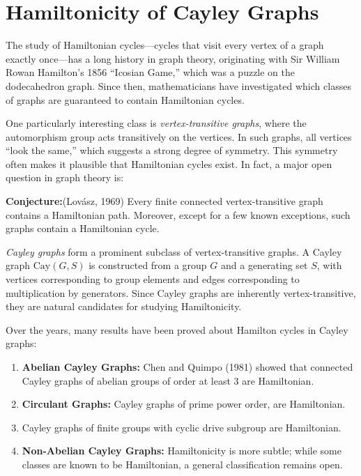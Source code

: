 \documentclass[12pt,a4paper,openany]{book}
\begin{document}
\section{Hamiltonicity of Cayley Graphs}



The study of Hamiltonian cycles---cycles that visit every vertex of a graph exactly once---has a long history in graph theory, originating with Sir William Rowan Hamilton's 1856 ``Icosian Game,'' which was a puzzle on the dodecahedron graph. Since then, mathematicians have investigated which classes of graphs are guaranteed to contain Hamiltonian cycles.

One particularly interesting class is \emph{vertex-transitive graphs}, where the automorphism group acts transitively on the vertices. In such graphs, all vertices ``look the same,'' which suggests a strong degree of symmetry. This symmetry often makes it plausible that Hamiltonian cycles exist. In fact, a major open question in graph theory is:
\bigskip

\noindent\textbf{Conjecture:}(Lov\'asz, 1969) Every finite connected vertex-transitive graph contains a Hamiltonian path. Moreover, except for a few known exceptions, such graphs contain a Hamiltonian cycle.
\bigskip

\emph{Cayley graphs} form a prominent subclass of vertex-transitive graphs. A Cayley graph $\mathrm{Cay}(G,S)$ is constructed from a group $G$ and a generating set $S$, with vertices corresponding to group elements and edges corresponding to multiplication by generators. Since Cayley graphs are inherently vertex-transitive, they are natural candidates for studying Hamiltonicity.

Over the years, many results have been proved about Hamilton cycles in Cayley graphs:

\begin{enumerate}
    \item \textbf{Abelian Cayley Graphs:} Chen and Quimpo (1981) showed that connected Cayley graphs of abelian groups of order at least 3 are Hamiltonian.  
    \item \textbf{Circulant Graphs:} Cayley graphs of prime power order, are Hamiltonian.
    
    \item Cayley graphs of finite groups with cyclic drive subgroup are Hamiltonian.  
    \item \textbf{Non-Abelian Cayley Graphs:} Hamiltonicity is more subtle; while some classes are known to be Hamiltonian, a general classification remains open.  
\end{enumerate}
\end{document}
